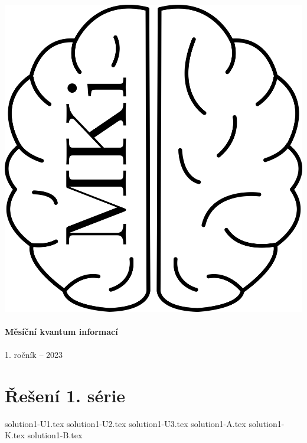 \documentclass{../../style/mkibrochure}
\begin{document}
\thispagestyle{firstpage}
\vspace*{\fill}
\begin{center}
\includegraphics[scale=1]{../logo/mkilogo.png}\\
\quad\\
\textbf{\Huge{Měsíční kvantum informací}}\\
\quad\\
\LARGE{1. ročník -- 2023}
\end{center}
\vspace*{\fill}
\newpage

\setcounter{page}{1}



\section*{\centering Řešení 1. série}
{solution1-U1.tex}
{solution1-U2.tex}
{solution1-U3.tex}
{solution1-A.tex}
{solution1-K.tex}
{solution1-B.tex}
\newpage
\end{document}
